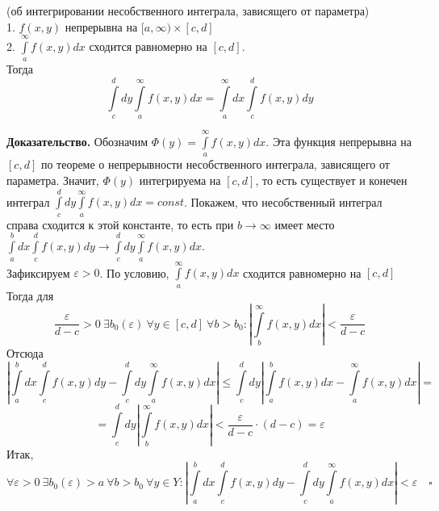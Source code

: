 \begin{theor}
    (об интегрировании несобственного интеграла, зависящего от параметра)\\
    1. $f(x,y)$ непрерывна на  $[a,\infty)\times [c,d]$\\
    2. $\int\limits_{a}^{\infty} f(x,y)dx$ сходится равномерно на $[c,d]$.\\
    Тогда 
    $$\int\limits_{c}^{d}dy \int\limits_{a}^{\infty}f(x,y)dx =
    \int\limits_{a}^{\infty}dx \int\limits_{c}^{d}f(x,y)dy$$
\end{theor}
\textbf{Доказательство.} Обозначим $\Phi(y)=\int\limits_{a}^{\infty}
f(x,y)dx$. Эта функция непрерывна на $[c,d]$ по теореме о 
непрерывности несобственного интеграла, зависящего от параметра. Значит,
$\Phi(y)$ интегрируема на  $[c,d]$, то есть существует и конечен 
интеграл  $\int\limits_{c}^{d}dy\int\limits_{a}^{\infty}f(x,y)dx=const$.
Покажем, что несобственный интеграл справа сходится к этой константе, то
есть при $b\to \infty$ имеет место
$\int\limits_{a}^{b} dx\int\limits_{c}^{d}f(x,y)dy\to
\int\limits_{c}^{d} dy \int\limits_{a}^{\infty} f(x,y)dx$. \\
Зафиксируем $\varepsilon>0$. По условию, $\int\limits_{a}^{\infty}f(x,y)dx$
сходится равномерно на $[c,d]$ Тогда для 
$$\frac{\varepsilon}{d-c}>0~\exists b_0(\varepsilon)~\forall y\in [c,d]~
\forall b>b_0:\left| \int\limits_{b}^{\infty}f(x,y)dx \right|<
\frac{\varepsilon}{d-c}$$
 Отсюда
$$\left| \int\limits_{a}^{b} dx\int\limits_{c}^{d}f(x,y)dy-
\int\limits_{c}^{d}dy \int\limits_{a}^{\infty}f(x,y)dx \right|\leqslant 
 \int\limits_{c}^{d}dy\left| \int\limits_{a}^{b} f(x,y)dx-
 \int\limits_{a}^{\infty} f(x,y)dx\right| =$$
$$=\int\limits_{c}^{d} dy\left| \int\limits_{b}^{\infty} f(x,y)dx \right|
<\frac{\varepsilon}{d-c}\cdot (d-c)=\varepsilon$$ 
Итак, 
$$\forall \varepsilon>0~\exists b_0(\varepsilon)>a~\forall b>b_0~\forall y\in 
Y:\left|  \int\limits_{a}^{b} dx\int\limits_{c}^{d}f(x,y)dy-
\int\limits_{c}^{d}dy \int\limits_{a}^{\infty}f(x,y)dx \right| <
\varepsilon \quad\square$$








